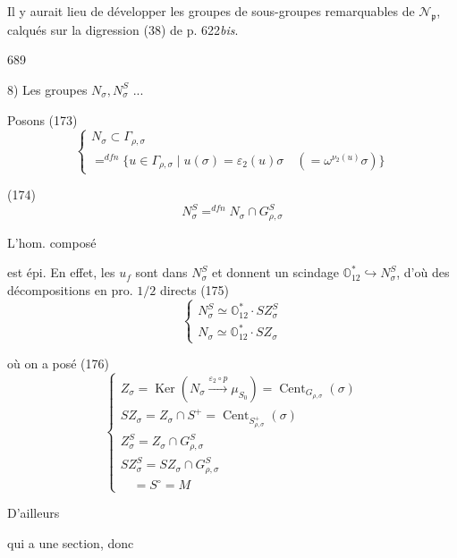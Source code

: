 Il y aurait lieu de développer les groupes de sous-groupes remarquables de $\mathcal{N}_{\mathfrak{p}}$, calqués sur la digression (38) de p. 622\textit{bis}.

\newpage


689

8) Les groupes $N_{\sigma}, N_{\sigma}^S$ ...

Posons
(173) $$ \begin{cases} N_{\sigma} \subset \Gamma_{\rho,\sigma} \\ =^{dfn} \{ u \in \Gamma_{\rho,\sigma} \mid u(\sigma) = \varepsilon_2(u)\sigma \quad (= \omega^{\nu_2(u)} \sigma) \} \end{cases} $$

(174) $$ N_{\sigma}^S =^{dfn} N_{\sigma} \cap G_{\rho,\sigma}^S $$

L'hom. composé
est épi. En effet, les $u_f$ sont dans $N_{\sigma}^S$ et donnent un scindage $\mathbb{O}_{12}^* \hookrightarrow N_{\sigma}^S$, d'où des décompositions en pro. $1/2$ directs
(175) $$ \begin{cases} N_{\sigma}^S \simeq \mathbb{O}_{12}^* \cdot S Z_{\sigma}^S \\ N_{\sigma} \simeq \mathbb{O}_{12}^* \cdot S Z_{\sigma} \end{cases} $$

où on a posé
(176) $$ \begin{cases} Z_{\sigma} = \operatorname{Ker}(N_{\sigma} \xrightarrow{\varepsilon_2 \circ p} \mu_{S_0}) = \operatorname{Cent}_{G_{\rho,\sigma}}(\sigma) \\ S Z_{\sigma} = Z_{\sigma} \cap S^+ = \operatorname{Cent}_{S^+_{\rho,\sigma}}(\sigma) \\ Z_{\sigma}^S = Z_{\sigma} \cap G_{\rho,\sigma}^S \\ S Z_{\sigma}^S = S Z_{\sigma} \cap G_{\rho,\sigma}^S \\ \quad = S^{\circ} = M \end{cases} $$

D'ailleurs
qui a une section, donc

